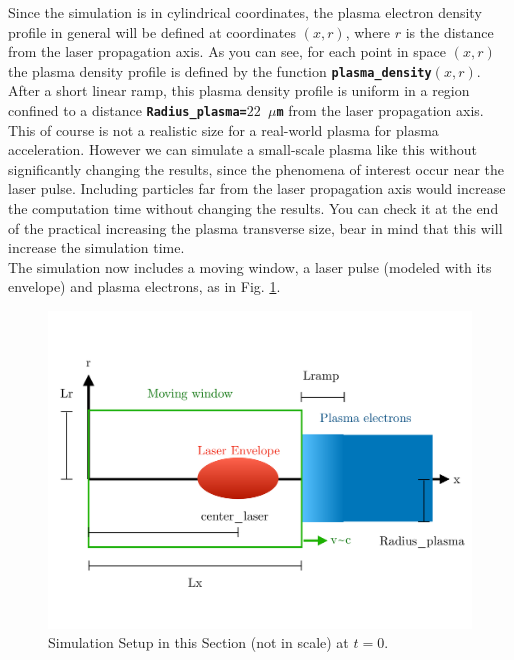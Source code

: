 \documentclass[a4paper,12pt]{extarticle}
\newcommand{\commandline}[1]{\texttt{\textbf{#1}}}
\begin{document}
Since the simulation is in cylindrical coordinates, the plasma electron density profile in general will be defined at coordinates $(x,r)$, where $r$ is the distance from the laser propagation axis. As you can see, for each point in space $(x,r)$ the plasma density profile is defined by the function \commandline{plasma\_density$(x,r)$}. After a short linear ramp, this plasma density profile is uniform in a region confined to a distance \commandline{Radius\_plasma=$22$ $\mu$m} from the laser propagation axis. This of course is not a realistic size for a real-world plasma for plasma acceleration. However we can simulate a small-scale plasma like this without significantly changing the results, since the phenomena of interest occur near the laser pulse. Including particles far from the laser propagation axis would increase the computation time without changing the results. You can check it at the end of the practical increasing the plasma transverse size, bear in mind that this will increase the simulation time.\\

The simulation now includes a moving window, a laser pulse (modeled with its envelope) and plasma electrons, as in Fig. \ref{Schema2}.

\begin{figure}[h!]
  \begin{center}
  \includegraphics[scale=0.3]{Schema_Simulation_2.pdf}
  \end{center}
  \caption{Simulation Setup in this Section (not in scale) at $t=0$.}
  \label{Schema2}
\end{figure}
\end{document}
